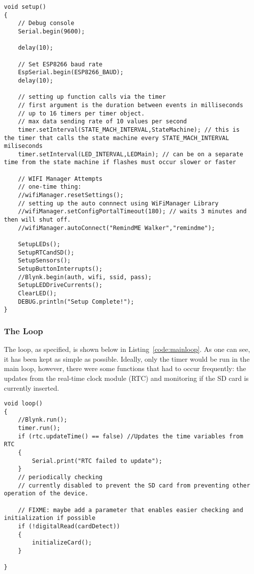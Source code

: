 \documentclass{article}
\begin{document}
\begin{lstlisting}[caption={The Main Setup}, label={code:mainsetup}]
void setup()
{
	// Debug console
	Serial.begin(9600);
	
	delay(10);
	
	// Set ESP8266 baud rate
	EspSerial.begin(ESP8266_BAUD);
	delay(10);
	
	// setting up function calls via the timer 
	// first argument is the duration between events in milliseconds 
	// up to 16 timers per timer object. 
	// max data sending rate of 10 values per second
	timer.setInterval(STATE_MACH_INTERVAL,StateMachine); // this is the timer that calls the state machine every STATE_MACH_INTERVAL miliseconds
	timer.setInterval(LED_INTERVAL,LEDMain); // can be on a separate time from the state machine if flashes must occur slower or faster 
	
	// WIFI Manager Attempts 
	// one-time thing: 
	//wifiManager.resetSettings(); 
	// setting up the auto connnect using WiFiManager Library
	//wifiManager.setConfigPortalTimeout(180); // waits 3 minutes and then will shut off. 
	//wifiManager.autoConnect("RemindME Walker","remindme"); 
	
	SetupLEDs(); 
	SetupRTCandSD();   
	SetupSensors(); 
	SetupButtonInterrupts(); 
	//Blynk.begin(auth, wifi, ssid, pass);
	SetupLEDDriveCurrents(); 
	ClearLED(); 
	DEBUG.println("Setup Complete!"); 
}
\end{lstlisting}


\subsubsection{The Loop}
The loop, as specified, is shown below in Listing~\ref{code:mainloop}. As one can see, it has been kept as simple as possible. Ideally, only the timer would be run in the main loop, however, there were some functions that had to occur frequently: the updates from the real-time clock module (RTC) and monitoring if the SD card is currently inserted. 

\begin{lstlisting}[caption={The Main Loop}, label={code:mainloop}]
void loop()
{
	//Blynk.run();
	timer.run(); 
	if (rtc.updateTime() == false) //Updates the time variables from RTC
	{
		Serial.print("RTC failed to update");
	}
	// periodically checking 
	// currently disabled to prevent the SD card from preventing other operation of the device.
	
	// FIXME: maybe add a parameter that enables easier checking and initialization if possible
	if (!digitalRead(cardDetect))
	{
		initializeCard(); 
	}

}
\end{lstlisting}
\end{document}
